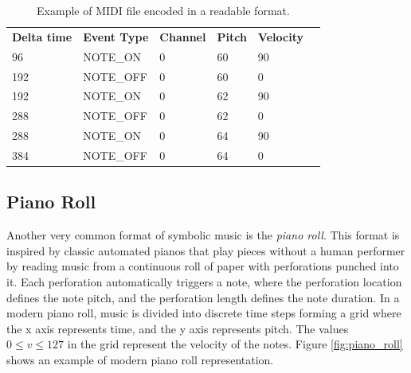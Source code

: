 \begin{table}[h]
    \centering
    \begin{tabular}{llllll}
        \textbf{Delta time} & \textbf{Event Type} & \textbf{Channel} & \textbf{Pitch} & \textbf{Velocity} \\
        96  & NOTE\_ON  & 0 & 60 & 90 \\
        192 & NOTE\_OFF & 0 & 60 & 0  \\
        192 & NOTE\_ON  & 0 & 62 & 90 \\
        288 & NOTE\_OFF & 0 & 62 & 0  \\
        288 & NOTE\_ON  & 0 & 64 & 90 \\
        384 & NOTE\_OFF & 0 & 64 & 0
    \end{tabular}
    \caption{Example of MIDI file encoded in a readable format.}
    \label{tab:midi}
\end{table}


\subsection{Piano Roll}
Another very common format of symbolic music is the \textit{piano roll}. This format is inspired by classic automated pianos that play pieces without a human performer by reading music from a continuous roll of paper with perforations punched into it. Each perforation automatically triggers a note, where the perforation location defines the note pitch, and the perforation length defines the note duration. In a modern piano roll, music is divided into discrete time steps forming a grid where the x axis represents time, and the y axis represents pitch. The values $0 \leq v \leq 127$ in the grid represent the velocity of the notes. Figure \ref{fig:piano_roll} shows an example of modern piano roll representation.

